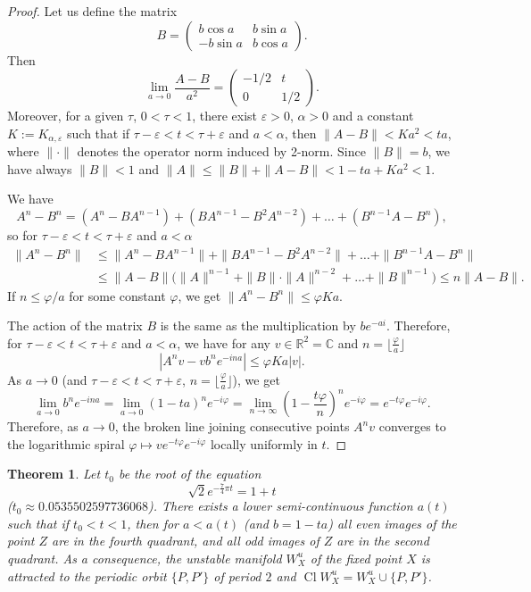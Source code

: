 \documentclass[12pt]{amsart}
\theoremstyle{plain}
\newtheorem{theorem}{Theorem}[section]
\theoremstyle{definition}
\def\R{{\mathbb R}}
\newcommand{\C}{\mathbb{C}}
\def\eps{\varepsilon}
\renewcommand{\phi}{\varphi}
\def\Cl{\mathop\mathrm{Cl}}
\begin{document}
	\begin{proof}
		Let us define the matrix
		\[
		B=
		\begin{pmatrix}
			b\cos a & b\sin a\\
			-b\sin a & b\cos a
		\end{pmatrix}.
		\]
		Then
		\[
		\lim_{a\to 0}\frac{A-B}{a^2}=
		\begin{pmatrix}
			-1/2 & t\\
			0 & 1/2
		\end{pmatrix}.
		\]
		Moreover, for a given $\tau$, $0 < \tau < 1$, there exist $\eps > 0$, 
		$\alpha > 0$ and a constant $K := K_{\alpha, \eps}$ such that if 
		$\tau - \eps < t < \tau + \eps$ and $a < \alpha$, then 
		$\|A-B\|<Ka^2<ta$, where $\| \cdot \|$ denotes the operator norm 
		induced by 2-norm. Since $\|B\|=b$, we have always $\|B\|<1$ and 
		$\|A\|\le\|B\|+\|A-B\|< 1-ta+Ka^2<1$.
		
		We have
		\[
		A^n-B^n=(A^n-BA^{n-1})+(BA^{n-1}-B^2A^{n-2})+\dots+(B^{n-1}A-B^n),
		\]
		so for $\tau - \eps < t < \tau + \eps$ and $a < \alpha$
		\[\begin{split}
			\|A^n-B^n\|&\le\|A^n-BA^{n-1}\|+\|BA^{n-1}-B^2A^{n-2}\|+\dots+
			\|B^{n-1}A-B^n\|\\
			&\le\|A-B\|\big(\|A\|^{n-1}+\|B\|\cdot\|A\|^{n-2}+\dots+\|B\|^{n-1}
			\big)\le n\|A-B\|.
		\end{split}\]
		If $n\le\phi/a$ for some constant $\phi$, we get
		$\|A^n-B^n\|\le\phi Ka$.
		
		The action of the matrix $B$ is the same as the multiplication by
		$be^{-ai}$. Therefore, for $\tau - \eps < t < \tau + \eps$ and 
		$a < \alpha$, we have for any $v\in\R^2=\C$ and 
		$n=\lfloor\frac\phi{a}\rfloor$
		\[
		|A^nv-vb^ne^{-ina}| \le \phi Ka|v|.
		\]
		As $a\to 0$ (and $\tau - \eps < t < \tau + \eps$, 
		$n=\lfloor\frac\phi{a}\rfloor$), we get
		\[
		\lim_{a\to 0}b^ne^{-ina}=\lim_{a\to 0}(1-ta)^ne^{-i\phi}=
		\lim_{n\to\infty}\left(1-\frac{t\phi}n\right)^ne^{-i\phi}=
		e^{-t\phi}e^{-i\phi}.
		\]
		Therefore, as $a\to 0$, the broken line joining consecutive points
		$A^nv$ converges to the logarithmic spiral 
		$\phi\mapsto ve^{-t\phi}e^{-i\phi}$ locally uniformly in $t$.
	\end{proof}
	
	\begin{theorem}\label{t1}
		Let $t_0$ be the root of the equation
		\begin{equation}\label{e1}
			\sqrt{2}e^{-\frac74\pi t} = 1 + t
		\end{equation}
		($t_0 \approx 0.0535502597736068$). There exists a lower 
		semi-continuous function $a(t)$ such that if $t_0 < t < 1$, then for 
		$a < a(t)$ (and $b = 1 - ta$) all even images of the point $Z$ are 
		in the fourth quadrant, and all odd images of $Z$ are in the second 
		quadrant. As a consequence, the unstable manifold $W^u_X$ of the 
		fixed point $X$ is attracted to the periodic orbit $\{ P, P' \}$ of 
		period $2$ and $\Cl W^u_X = W^u_X \cup \{ P, P' \}$.
	\end{theorem}
	
\end{document}
